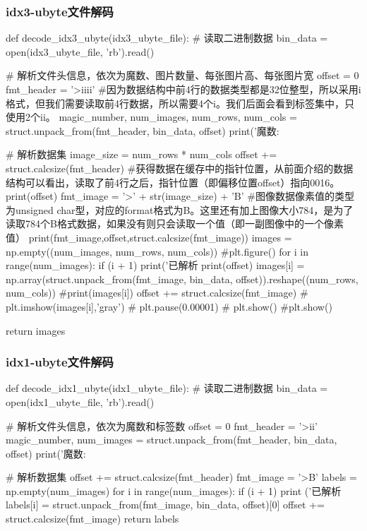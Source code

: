 \subsubsection{idx3-ubyte文件解码}
\begin{python}
  def decode_idx3_ubyte(idx3_ubyte_file):
    # 读取二进制数据
    bin_data = open(idx3_ubyte_file, 'rb').read()

    # 解析文件头信息，依次为魔数、图片数量、每张图片高、每张图片宽
    offset = 0
    fmt_header = '>iiii' #因为数据结构中前4行的数据类型都是32位整型，所以采用i格式，但我们需要读取前4行数据，所以需要4个i。我们后面会看到标签集中，只使用2个ii。
    magic_number, num_images, num_rows, num_cols = struct.unpack_from(fmt_header, bin_data, offset)
    print('魔数:%

    # 解析数据集
    image_size = num_rows * num_cols
    offset += struct.calcsize(fmt_header)  #获得数据在缓存中的指针位置，从前面介绍的数据结构可以看出，读取了前4行之后，指针位置（即偏移位置offset）指向0016。
    print(offset)
    fmt_image = '>' + str(image_size) + 'B'  #图像数据像素值的类型为unsigned char型，对应的format格式为B。这里还有加上图像大小784，是为了读取784个B格式数据，如果没有则只会读取一个值（即一副图像中的一个像素值）
    print(fmt_image,offset,struct.calcsize(fmt_image))
    images = np.empty((num_images, num_rows, num_cols))
    #plt.figure()
    for i in range(num_images):
        if (i + 1) %
            print('已解析 %
            print(offset)
        images[i] = np.array(struct.unpack_from(fmt_image, bin_data, offset)).reshape((num_rows, num_cols))
        #print(images[i])
        offset += struct.calcsize(fmt_image)
#        plt.imshow(images[i],'gray')
#        plt.pause(0.00001)
#        plt.show()
    #plt.show()

    return images
\end{python}

\subsubsection{idx1-ubyte文件解码}
\begin{python}
  def decode_idx1_ubyte(idx1_ubyte_file):
    # 读取二进制数据
    bin_data = open(idx1_ubyte_file, 'rb').read()

    # 解析文件头信息，依次为魔数和标签数
    offset = 0
    fmt_header = '>ii'
    magic_number, num_images = struct.unpack_from(fmt_header, bin_data, offset)
    print('魔数:%

    # 解析数据集
    offset += struct.calcsize(fmt_header)
    fmt_image = '>B'
    labels = np.empty(num_images)
    for i in range(num_images):
        if (i + 1) %
            print ('已解析 %
        labels[i] = struct.unpack_from(fmt_image, bin_data, offset)[0]
        offset += struct.calcsize(fmt_image)
    return labels
\end{python}

